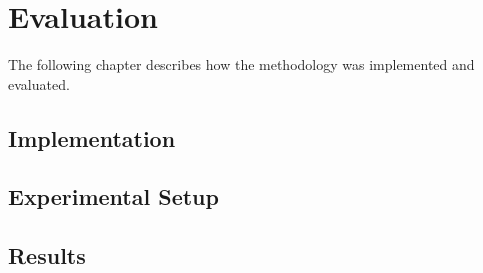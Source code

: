 \chapter{Evaluation}
The following chapter describes how the methodology was implemented and evaluated. 


\section{Implementation}
\label{sec:implementation}
\section{Experimental Setup}
\section{Results}